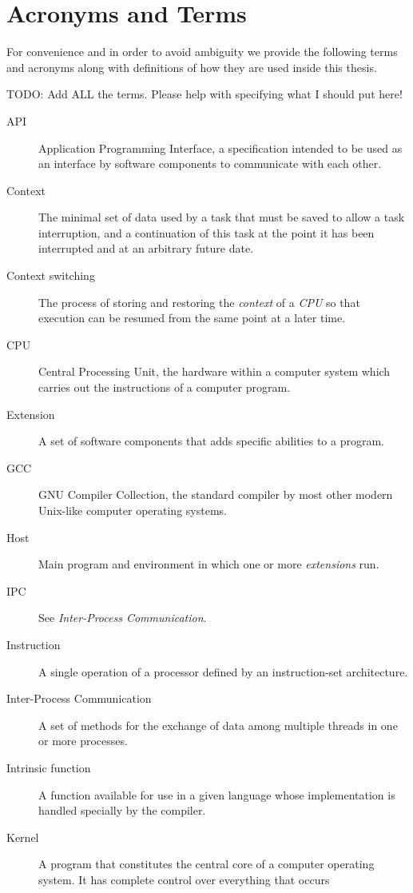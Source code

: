 \chapter {Acronyms and Terms} \label{appA}

For convenience and in order to avoid ambiguity we provide the following terms
and acronyms along with definitions of how they are used inside this thesis.

TODO: Add ALL the terms. Please help with specifying what I should put here!

\begin {description}
	\item [API] Application Programming Interface, a specification intended to
		be used as an interface by software components to communicate with each
		other.
	\item [Context] The minimal set of data used by a task that must be saved
		to allow a task interruption, and a continuation of this task at the
		point it has been interrupted and at an arbitrary future date.
	\item [Context switching] The process of storing and restoring the
		\emph{context} of a \emph{CPU} so that execution can be resumed from
		the same point at a later time.
	\item [CPU] Central Processing Unit, the hardware within a computer system
		which carries out the instructions of a computer program.
	\item [Extension] A set of software components that adds specific abilities
		to a program.
	\item [GCC] GNU Compiler Collection, the standard compiler by most other
		modern Unix-like computer operating systems.
	\item [Host] Main program and environment in which one or more
		\emph{extensions} run.
	\item [IPC] See \emph{Inter-Process Communication}.
	\item [Instruction] A single operation of a processor defined by an
		instruction-set architecture.
	\item [Inter-Process Communication] A set of methods for the exchange of
		data among multiple threads in one or more processes.
	\item [Intrinsic function] A function available for use in a given language
		whose implementation is handled specially by the compiler.
	\item [Kernel] A program that constitutes the central core of a computer
		operating system. It has complete control over everything that occurs

\end{description}
